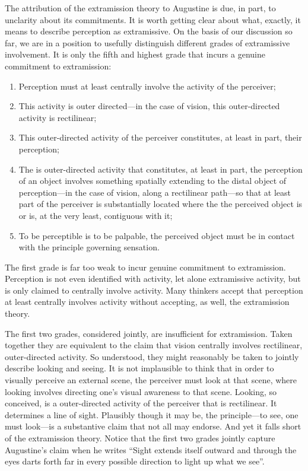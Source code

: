 \documentclass[12pt]{article}
\begin{document}
The attribution of the extramission theory to Augustine is due, in part, to unclarity about its commitments. It is worth getting clear about what, exactly, it means to describe perception as extramissive. On the basis of our discussion so far, we are in a position to usefully distinguish different grades of extramissive involvement. It is only the fifth and highest grade that incurs a genuine commitment to extramission:
\begin{enumerate}
	\item Perception must at least centrally involve the activity of the perceiver;
	\item This activity is outer directed---in the case of vision, this outer-directed activity is rectilinear;
	\item This outer-directed activity of the perceiver constitutes, at least in part, their perception;
	\item The is outer-directed activity that constitutes, at least in part, the perception of an object involves something spatially extending to the distal object of perception---in the case of vision, along a rectilinear path---so that at least part of the perceiver is substantially located where the the perceived object is or is, at the very least, contiguous with it;
	\item To be perceptible is to be palpable, the perceived object must be in contact with the principle governing sensation.
\end{enumerate}

The first grade is far too weak to incur genuine commitment to extramission. Perception is not even identified with activity, let alone extramissive activity, but is only claimed to centrally involve activity. Many thinkers accept that perception at least centrally involves activity without accepting, as well, the extramission theory. 

The first two grades, considered jointly, are insufficient for extramission. Taken together they are equivalent to the claim that vision centrally involves rectilinear, outer-directed activity. So understood, they might reasonably be taken to jointly describe looking and seeing. It is not implausible to think that in order to visually perceive an external scene, the perceiver must look at that scene, where looking involves directing one's visual awareness to that scene. Looking, so conceived, is a outer-directed activity of the perceiver that is rectilinear. It determines a line of sight. Plausibly though it may be, the principle---to see, one must look---is a substantive claim that not all may endorse. And yet it falls short of the extramission theory. Notice that the first two grades jointly capture Augustine's claim when he writes ``Sight extends itself outward and through the eyes darts forth far in every possible direction to light up what we see''.
\end{document}
